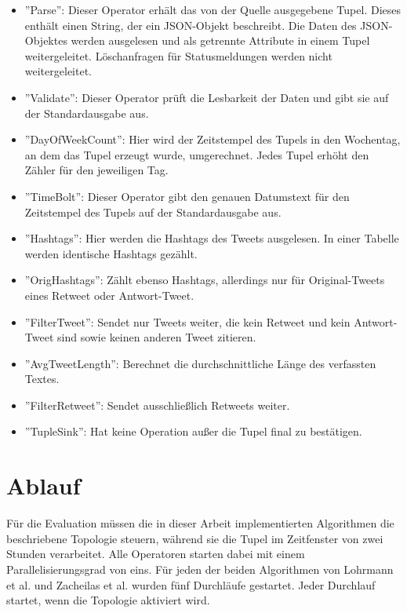 \begin{itemize}
\item{''Parse'': Dieser Operator erhält das von der Quelle ausgegebene Tupel. Dieses enthält einen String, der ein JSON-Objekt beschreibt. Die Daten des JSON-Objektes werden ausgelesen und als getrennte Attribute in einem Tupel weitergeleitet. Löschanfragen für Statusmeldungen werden nicht weitergeleitet.}
\item{''Validate'': Dieser Operator prüft die Lesbarkeit der Daten und gibt sie auf der Standardausgabe aus.}
\item{''DayOfWeekCount'': Hier wird der Zeitstempel des Tupels in den Wochentag, an dem das Tupel erzeugt wurde, umgerechnet. Jedes Tupel erhöht den Zähler für den jeweiligen Tag.}
\item{''TimeBolt'': Dieser Operator gibt den genauen Datumstext für den Zeitstempel des Tupels auf der Standardausgabe aus.}
\item{''Hashtags'': Hier werden die Hashtags des Tweets ausgelesen. In einer Tabelle werden identische Hashtags gezählt.}
\item{''OrigHashtags'': Zählt ebenso Hashtags, allerdings nur für Original-Tweets eines Retweet oder Antwort-Tweet.}
\item{''FilterTweet'': Sendet nur Tweets weiter, die kein Retweet und kein Antwort-Tweet sind sowie keinen anderen Tweet zitieren.}
\item{''AvgTweetLength'': Berechnet die durchschnittliche Länge des verfassten Textes.}
\item{''FilterRetweet'': Sendet ausschließlich Retweets weiter.}
\item{''TupleSink'': Hat keine Operation außer die Tupel final zu bestätigen.}
\end{itemize}

\section{Ablauf}

Für die Evaluation müssen die in dieser Arbeit implementierten Algorithmen die beschriebene Topologie steuern, während sie die Tupel im Zeitfenster von zwei Stunden verarbeitet.
Alle Operatoren starten dabei mit einem Parallelisierungsgrad von eins.
Für jeden der beiden Algorithmen von Lohrmann et al. und Zacheilas et al. wurden fünf Durchläufe gestartet.
Jeder Durchlauf startet, wenn die Topologie aktiviert wird.

